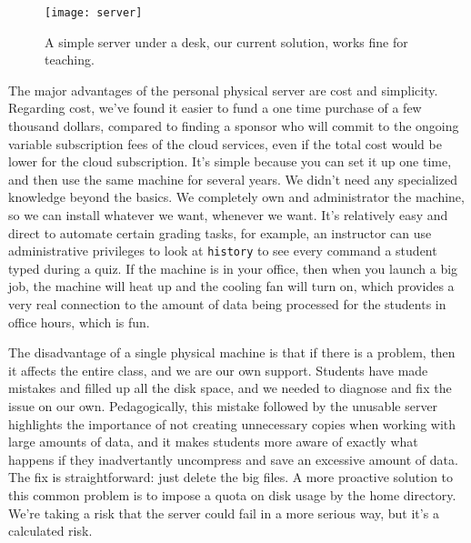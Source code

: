\documentclass[12pt]{article}
\begin{document}
\begin{figure}[h]
    \centering
    \texttt{[image: server]}
    \caption{A simple server under a desk, our current solution, works fine for teaching.}
    \label{fig:server}
\end{figure}

The major advantages of the personal physical server are cost and simplicity.
Regarding cost, we've found it easier to fund a one time purchase of a few thousand dollars, compared to finding a sponsor who will commit to the ongoing variable subscription fees of the cloud services, even if the total cost would be lower for the cloud subscription.
It's simple because you can set it up one time, and then use the same machine for several years.
We didn't need any specialized knowledge beyond the basics.
We completely own and administrator the machine, so we can install whatever we want, whenever we want.
It's relatively easy and direct to automate certain grading tasks, for example, an instructor can use administrative privileges to look at \texttt{history} to see every command a student typed during a quiz.
If the machine is in your office, then when you launch a big job, the machine will heat up and the cooling fan will turn on, which provides a very real connection to the amount of data being processed for the students in office hours, which is fun.

The disadvantage of a single physical machine is that if there is a problem, then it affects the entire class, and we are our own support.
Students have made mistakes and filled up all the disk space, and we needed to diagnose and fix the issue on our own.
Pedagogically, this mistake followed by the unusable server highlights the importance of not creating unnecessary copies when working with large amounts of data, and it makes students more aware of exactly what happens if they inadvertantly uncompress and save an excessive amount of data.
The fix is straightforward: just delete the big files.
A more proactive solution to this common problem is to impose a quota on disk usage by the home directory.
We're taking a risk that the server could fail in a more serious way, but it's a calculated risk.

\end{document}
